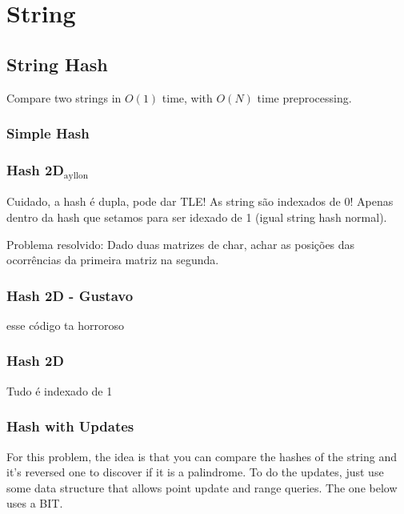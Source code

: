 \chapter{String}
    
    \section{String Hash}
    Compare two strings in $O(1)$ time, with $O(N)$ time preprocessing.
    \subsection{Simple Hash}
    
    \subsection{Hash 2D$_{\text{ayllon}}$}
    Cuidado, a hash é dupla, pode dar TLE!
    As string são indexados de 0!
    Apenas dentro da hash que setamos para ser idexado de 1 (igual string hash normal).

    Problema resolvido: Dado duas matrizes de char, achar as posições das ocorrências da primeira matriz na segunda.
    

    \subsection{Hash 2D - Gustavo}
    esse código ta horroroso
    
    \subsection{Hash 2D}
    Tudo é indexado de 1
    

    \subsection{Hash with Updates}

    For this problem, the idea is that you can compare the hashes of the string and it's reversed one to discover if it is a palindrome. To do the updates, just use some data structure that allows point update and range queries. The one below uses a BIT.
    
    
